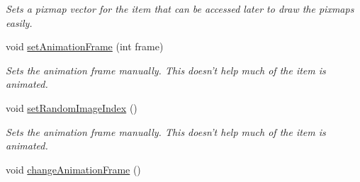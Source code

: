 \begin{DoxyCompactItemize}
\begin{DoxyCompactList}\small\item\em Sets a pixmap vector for the item that can be accessed later to draw the pixmaps easily. \end{DoxyCompactList}\item 
void \hyperlink{class_student_1_1_scene_item_a2ef741a429d79d915aba9c9be345e3c2}{set\-Animation\-Frame} (int frame)
\begin{DoxyCompactList}\small\item\em Sets the animation frame manually. This doesn't help much of the item is animated. \end{DoxyCompactList}\item 
void \hyperlink{class_student_1_1_scene_item_a747b9b5b1847c0c34a8270b4fc42c3fd}{set\-Random\-Image\-Index} ()
\begin{DoxyCompactList}\small\item\em Sets the animation frame manually. This doesn't help much of the item is animated. \end{DoxyCompactList}\item 
\hypertarget{class_student_1_1_scene_item_a9b9b0626cca4d3748662f7feb043cba4}{void \hyperlink{class_student_1_1_scene_item_a9b9b0626cca4d3748662f7feb043cba4}{change\-Animation\-Frame} ()}\label{class_student_1_1_scene_item_a9b9b0626cca4d3748662f7feb043cba4}


\end{DoxyCompactItemize}
